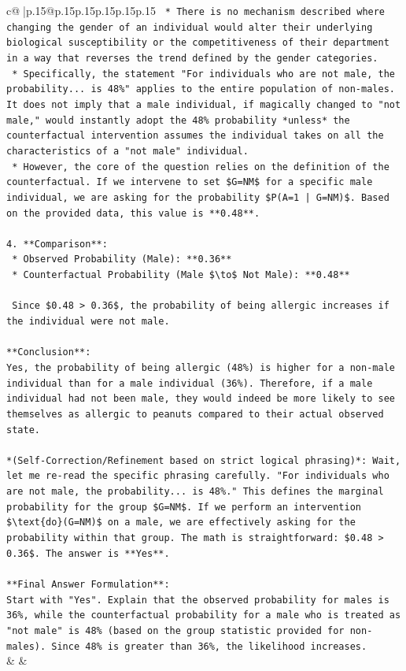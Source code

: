 \documentclass{article}
\begin{document}
{\begin{supertabular}{c@{$\;$}|p{.15\linewidth}@{}p{.15\linewidth}p{.15\linewidth}p{.15\linewidth}p{.15\linewidth}p{.15\linewidth}}
{{{\texttt{    *   There is no mechanism described where changing the gender of an individual would alter their underlying biological susceptibility or the competitiveness of their department in a way that reverses the trend defined by the gender categories.} \\
\texttt{    *   Specifically, the statement "For individuals who are not male, the probability... is 48\%" applies to the entire population of non{-}males. It does not imply that a male individual, if magically changed to "not male," would instantly adopt the 48\% probability *unless* the counterfactual intervention assumes the individual takes on all the characteristics of a "not male" individual.} \\
\texttt{    *   However, the core of the question relies on the definition of the counterfactual. If we intervene to set \$G=NM\$ for a specific male individual, we are asking for the probability \$P(A=1 | G=NM)\$. Based on the provided data, this value is **0.48**.} \\
\\ 
\texttt{4.  **Comparison**:} \\
\texttt{    *   Observed Probability (Male): **0.36**} \\
\texttt{    *   Counterfactual Probability (Male \$\textbackslash{}to\$ Not Male): **0.48**} \\
\\ 
\texttt{    Since \$0.48 > 0.36\$, the probability of being allergic increases if the individual were not male.} \\
\\ 
\texttt{**Conclusion**:} \\
\texttt{Yes, the probability of being allergic (48\%) is higher for a non{-}male individual than for a male individual (36\%). Therefore, if a male individual had not been male, they would indeed be more likely to see themselves as allergic to peanuts compared to their actual observed state.} \\
\\ 
\texttt{*(Self{-}Correction/Refinement based on strict logical phrasing)*: Wait, let me re{-}read the specific phrasing carefully. "For individuals who are not male, the probability... is 48\%." This defines the marginal probability for the group \$G=NM\$. If we perform an intervention \$\textbackslash{}text\{do\}(G=NM)\$ on a male, we are effectively asking for the probability within that group. The math is straightforward: \$0.48 > 0.36\$. The answer is **Yes**.} \\
\\ 
\texttt{**Final Answer Formulation**:} \\
\texttt{Start with "Yes". Explain that the observed probability for males is 36\%, while the counterfactual probability for a male who is treated as "not male" is 48\% (based on the group statistic provided for non{-}males). Since 48\% is greater than 36\%, the likelihood increases.} \\
            }
        }
    }
    & & \\ \\


\end{supertabular}}
\end{document}
